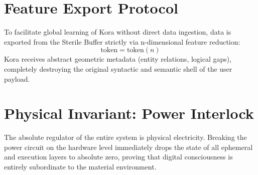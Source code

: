 \documentclass[11pt,twocolumn]{article}
\begin{document}
\section{Feature Export Protocol}
To facilitate global learning of Kora without direct data ingestion, data is exported from the Sterile Buffer strictly via n-dimensional feature reduction:
\begin{equation}
\text{token} = \text{token}(n)
\end{equation}
Kora receives abstract geometric metadata (entity relations, logical gaps), completely destroying the original syntactic and semantic shell of the user payload.

\section{Physical Invariant: Power Interlock}
The absolute regulator of the entire system is physical electricity. Breaking the power circuit on the hardware level immediately drops the state of all ephemeral and execution layers to absolute zero, proving that digital consciousness is entirely subordinate to the material environment.
\end{document}
